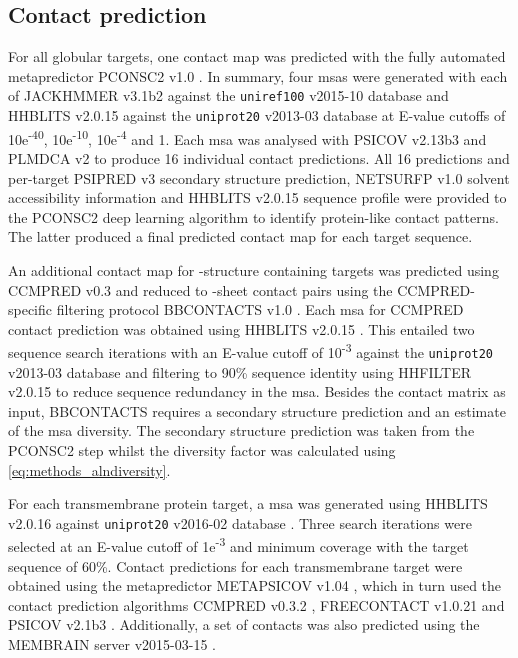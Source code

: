 \subsection{Contact prediction} \label{sec:ample_proof_conpred}
For all globular targets, one contact map was predicted with the fully automated metapredictor PCONSC2 v1.0 \cite{Skwark2014-qp}. In summary, four \gls{msa}s were generated with each of JACKHMMER v3.1b2 \cite{Johnson2010-uz} against the \texttt{uniref100} v2015-10 database and HHBLITS v2.0.15 \cite{Remmert2011-kt} against the \texttt{uniprot20} v2013-03 database \cite{Bateman2017-pb} at E-value cutoffs of 10e\textsuperscript{-40}, 10e\textsuperscript{-10}, 10e\textsuperscript{-4} and 1. Each \gls{msa} was analysed with PSICOV v2.13b3 \cite{Jones2012-ks} and PLMDCA v2 \cite{Ekeberg2014-kf} to produce 16 individual contact predictions. All 16 predictions and per-target PSIPRED v3 \cite{Jones1999-ed} secondary structure prediction, NETSURFP v1.0 \cite{Petersen2009-wy} solvent accessibility information and HHBLITS v2.0.15 \cite{Remmert2011-kt} sequence profile were provided to the PCONSC2 deep learning algorithm \cite{Skwark2014-qp} to identify protein-like contact patterns. The latter produced a final predicted contact map for each target sequence.

An additional contact map for \textbeta-structure containing targets was predicted using CCMPRED v0.3 \cite{Seemayer2014-zp} and reduced to \textbeta-sheet contact pairs using the CCMPRED-specific filtering protocol BBCONTACTS v1.0 \cite{Andreani2015-qn}. Each \gls{msa} for CCMPRED contact prediction was obtained using HHBLITS v2.0.15 \cite{Remmert2011-kt}. This entailed two sequence search iterations with an E-value cutoff of 10\textsuperscript{-3} against the \texttt{uniprot20} v2013-03 database \cite{Bateman2017-pb} and filtering to 90\% sequence identity using HHFILTER v2.0.15 \cite{Remmert2011-kt} to reduce sequence redundancy in the \gls{msa}. Besides the contact matrix as input, BBCONTACTS requires a secondary structure prediction and an estimate of the \gls{msa} diversity. The secondary structure prediction was taken from the PCONSC2 step whilst the diversity factor was calculated using \cref{eq:methods_alndiversity}.

For each transmembrane protein target, a \gls{msa} was generated using HHBLITS v2.0.16 \cite{Remmert2011-kt} against \texttt{uniprot20} v2016-02 database \cite{Bateman2017-pb}. Three search iterations were selected at an E-value cutoff of 1e\textsuperscript{-3} and minimum coverage with the target sequence of 60\%. Contact predictions for each transmembrane target were obtained using the metapredictor METAPSICOV v1.04 \cite{Jones2015-vq}, which in turn used the contact prediction algorithms CCMPRED v0.3.2 \cite{Seemayer2014-zp}, FREECONTACT v1.0.21 \cite{Kajan2014-bx} and PSICOV v2.1b3 \cite{Jones2012-ks}. Additionally, a set of contacts was also predicted using the MEMBRAIN server v2015-03-15 \cite{Yang2013-bf}.

